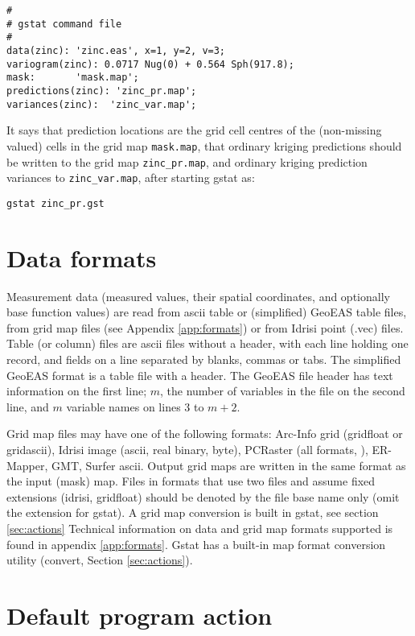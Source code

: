 \documentclass[a4paper,12pt]{book}
\renewcommand{\cite}{\citet}
\begin{document}
\begin{verbatim}
#
# gstat command file
#
data(zinc): 'zinc.eas', x=1, y=2, v=3;
variogram(zinc): 0.0717 Nug(0) + 0.564 Sph(917.8);
mask:       'mask.map';
predictions(zinc): 'zinc_pr.map';
variances(zinc):  'zinc_var.map';
\end{verbatim}

It says that prediction locations are the grid cell centres of the
(non-missing valued) cells in the grid map {\tt mask.map}, that ordinary
kriging predictions should be written to the grid map {\tt zinc\_pr.map},
and ordinary kriging prediction variances to {\tt zinc\_var.map}, after
starting gstat as:

\verb|gstat zinc_pr.gst|

\section{Data formats}
\label{sec:formats}

Measurement data (measured values, their spatial coordinates, and
optionally base function values) are read from ascii table or (simplified)
GeoEAS table files, from grid map files (see Appendix \ref{app:formats})
or from Idrisi point (.vec) files. Table (or column) files are ascii
files without a header, with each line holding one record, and fields
on a line separated by blanks, commas or tabs. The simplified GeoEAS
format is a table file with a header. The GeoEAS file header has text
information on the first line; $m$, the number of variables in the file
on the second line, and $m$ variable names on lines 3 to $m+2$.

Grid map files may have one of the following formats: Arc-Info grid
(gridfloat or gridascii), Idrisi image (ascii, real binary, byte),
PCRaster (all formats, \cite{vandeursen92}), ER-Mapper, GMT, Surfer
ascii. Output grid maps are written in the same format as the input (mask)
map. Files in formats that use two files and assume fixed extensions
(idrisi, gridfloat) should be denoted by the file base name only (omit
the extension for gstat). A grid map conversion is built in gstat,
see section \ref{sec:actions} Technical information on data and grid
map formats supported is found in appendix \ref{app:formats}. Gstat
has a built-in map format conversion utility (convert, Section
\ref{sec:actions}).

\section{Default program action}
\end{document}
